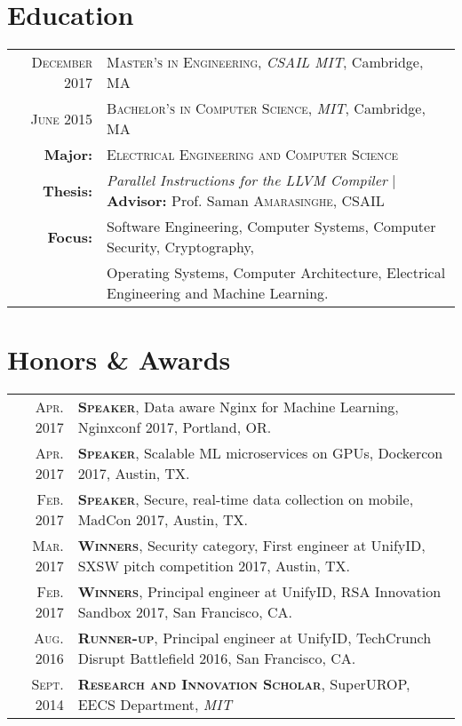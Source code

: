 \documentclass[lettersize,10pt]{article}
\begin{document}
\section{Education}
\begin{tabular}{rl}

\textsc{December} 2017 & \textsc{Master's in Engineering}, \emph{CSAIL MIT}, Cambridge, MA\\
\textsc{June} 2015 & \textsc{Bachelor's in Computer Science}, \emph{MIT}, Cambridge, MA\\
\textbf{Major:} & \textsc{Electrical Engineering and Computer Science}\\
\textbf{Thesis:} & \emph{Parallel Instructions for the LLVM Compiler} | \textbf{Advisor:} Prof. Saman \textsc{Amarasinghe}, CSAIL\\
\textbf{Focus:} &  Software Engineering, Computer Systems, Computer Security, Cryptography, \\
& Operating Systems, Computer Architecture, Electrical Engineering and Machine Learning.\\
\end{tabular}

\section{Honors \& Awards}
\begin{tabular}{rl}
    \textsc{Apr.} 2017 & \textsc{\textbf{Speaker}}, Data aware Nginx for Machine Learning, Nginxconf 2017, Portland, OR. \\
    \textsc{Apr.} 2017 & \textsc{\textbf{Speaker}}, Scalable ML microservices on GPUs, Dockercon 2017, Austin, TX. \\
    \textsc{Feb.} 2017 & \textsc{\textbf{Speaker}}, Secure, real-time data collection on mobile, MadCon 2017, Austin, TX. \\
    \textsc{Mar.} 2017 & \textsc{\textbf{Winners}}, Security category, First engineer at UnifyID, SXSW pitch competition 2017, Austin, TX. \\
    \textsc{Feb.} 2017 & \textsc{\textbf{Winners}}, Principal engineer at UnifyID, RSA Innovation Sandbox 2017, San Francisco, CA. \\
    \textsc{Aug.} 2016 & \textsc{\textbf{Runner-up}}, Principal engineer at UnifyID, TechCrunch Disrupt Battlefield 2016, San Francisco, CA. \\
    \textsc{Sept.} 2014 & \textsc{\textbf{Research and Innovation Scholar}}, SuperUROP, EECS Department, \emph{MIT}\\
\end{tabular}
\end{document}
